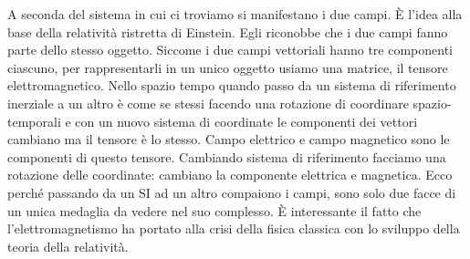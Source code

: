 \begin{figure}[htpb]
\end{figure}
\FloatBarrier

A seconda del sistema in cui ci troviamo si manifestano i due campi. È l'idea alla base della relatività ristretta di Einstein. Egli riconobbe che i due campi fanno parte dello stesso oggetto. Siccome i due campi vettoriali hanno tre componenti ciascuno, per rappresentarli in un unico oggetto usiamo una matrice, il tensore elettromagnetico. Nello spazio tempo quando passo da un sistema di riferimento inerziale a un altro è come se stessi facendo una rotazione di coordinare spazio-temporali e con un nuovo sistema di coordinate le componenti dei vettori cambiano ma il tensore è lo stesso. Campo elettrico e campo magnetico sono le componenti di questo tensore. Cambiando sistema di riferimento facciamo una rotazione delle coordinate: cambiano la componente elettrica e magnetica. Ecco perché passando da un SI ad un altro compaiono i campi, sono solo due facce di un unica medaglia da vedere nel suo complesso. È interessante il fatto che l'elettromagnetismo ha portato alla crisi della fisica classica con lo sviluppo della teoria della relatività.